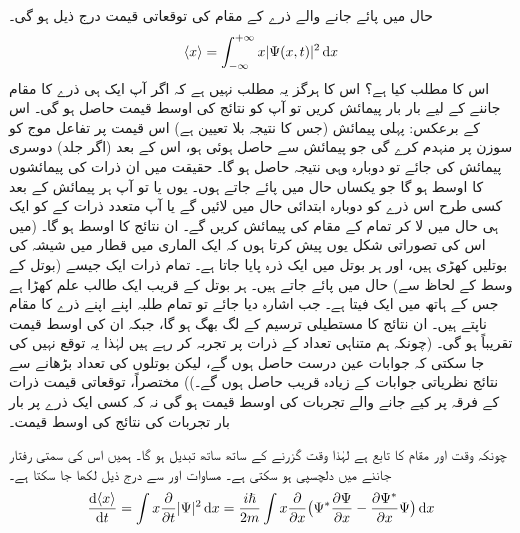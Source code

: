  حال  میں پائے جانے والے ذرے   کے مقام  کی توقعاتی قیمت درج ذیل ہو گی۔
\begin{align}\label{مساوات_تفاعل_موج_معیار_حرکت_توقعاتی_قیمت_تعریف}
\langle x\rangle=\int_{-\infty}^{+\infty}x|\Psi (x,t)|^{2}\dif{x}
\end{align}
اس کا مطلب کیا ہے؟ اس کا  ہرگز یہ مطلب نہیں  ہے  کہ اگر آپ ایک ہی ذرے کا مقام جاننے کے لیے بار بار پیمائش کریں تو آپ کو نتائج کی اوسط قیمت   حاصل ہو گی۔ اس کے برعکس: پہلی پیمائش (جس کا نتیجہ بلا تعیین ہے)  اس قیمت پر تفاعل موج کو  سوزن  پر  منہدم  کرے گی   جو پیمائش سے حاصل ہوئی ہو، اس کے بعد (اگر جلد) دوسری پیمائش کی جائے تو  دوبارہ وہی نتیجہ  حاصل ہو گا۔ حقیقت میں 
 ان ذرات کی  پیمائشوں کا اوسط ہو گا  جو یکساں حال  میں پائے جاتے ہوں۔ یوں یا تو آپ ہر پیمائش کے بعد کسی طرح اس ذرے  کو دوبارہ ابتدائی حال  میں لائیں گے  یا آپ متعدد ذرات کے  کو ایک ہی حال   میں لا کر تمام کے مقام کی  پیمائش کریں گے۔ ان نتائج کا اوسط  ہو گا۔ (میں اس کی تصوراتی شکل یوں پیش کرتا ہوں کہ ایک الماری میں  قطار میں  شیشہ کی بوتلیں کھڑی ہیں،  اور ہر بوتل میں ایک ذرہ پایا جاتا ہے۔ تمام ذرات ایک جیسے  (بوتل کے وسط کے لحاظ سے) حال  میں پائے جاتے ہیں۔ ہر بوتل کے قریب ایک طالب علم  کھڑا ہے جس کے ہاتھ میں ایک فیتا  ہے۔ جب اشارہ  دیا جائے تو تمام طلبہ اپنے اپنے ذرے   کا مقام ناپتے ہیں۔ ان نتائج کا مستطیلی ترسیم  کے لگ بھگ ہو گا،  جبکہ ان کی اوسط قیمت تقریباً  ہو گی۔ (چونکہ ہم متناہی تعداد کے ذرات پر تجربہ  کر رہے ہیں لہٰذا  یہ توقع نہیں کی جا سکتی  کہ جوابات عین   درست  حاصل ہوں گے،  لیکن بوتلوں  کی تعداد بڑھانے سے نتائج نظریاتی جوابات کے  زیادہ قریب حاصل ہوں گے۔)) مختصراً،  توقعاتی قیمت ذرات کے  فرقہ پر کیے جانے والے تجربات کی اوسط قیمت ہو گی نہ کہ کسی ایک ذرے  پر بار بار تجربات کی نتائج کی اوسط قیمت۔

 چونکہ  وقت اور مقام کا تابع ہے لہٰذا وقت گزرنے کے ساتھ ساتھ  تبدیل ہو گا۔ ہمیں اس کی سمتی رفتار جاننے میں دلچسپی ہو سکتی ہے۔ مساوات   اور   سے درج ذیل  لکھا جا سکتا ہے۔
\begin{align}\label{مساوات_تفاعل_موج_رفتار_توقعاتی_الف}
\frac{\dif \,\langle x \rangle}{\dif{t}}=\int x\frac{\partial}{\partial{t}}|\Psi|^{2}\dif{x}=\frac{i\hslash}{2m}\int x\frac{\partial}{\partial{x}}\big (\Psi ^*\frac{\partial{\Psi}}{\partial{x}}-\frac{\partial{\Psi^ *}}{\partial{x}}\Psi \big)\dif{x}
\end{align}

